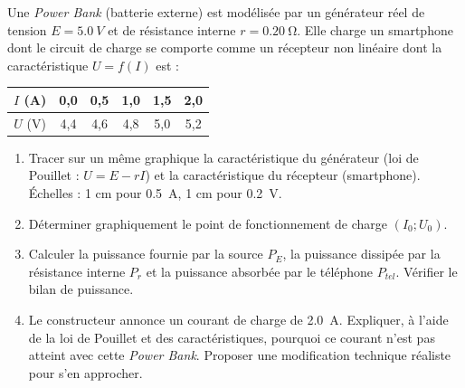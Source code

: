 \documentclass[11pt]{article}
\begin{document}
\begin{exercice}
Une \textit{Power Bank} (batterie externe) est modélisée par un générateur réel de tension $E = \SI{5,0}{V}$ et de résistance interne $r = \SI{0,20}{\ohm}$. Elle charge un smartphone dont le circuit de charge se comporte comme un récepteur non linéaire dont la caractéristique $U = f(I)$ est :
\begin{center}
\begin{tabular}{|c|c|c|c|c|c|}
\hline
$I$ (\si{\ampere}) & 0,0 & 0,5 & 1,0 & 1,5 & 2,0 \\
\hline $U$ (\si{\volt}) & 4,4 & 4,6 & 4,8 & 5,0 & 5,2 \\
\hline
\end{tabular}
\end{center}
\begin{enumerate}
\item Tracer sur un même graphique la caractéristique du générateur (loi de Pouillet : $U = E - rI$) et la caractéristique du récepteur (smartphone). Échelles : 1 cm pour \SI{0,5}{A}, 1 cm pour \SI{0,2}{V}.
\item Déterminer graphiquement le point de fonctionnement de charge $(I_0 ; U_0)$.
\item Calculer la puissance fournie par la source $P_E$, la puissance dissipée par la résistance interne $P_r$ et la puissance absorbée par le téléphone $P_{tel}$. Vérifier le bilan de puissance.
\item Le constructeur annonce un courant de charge de \SI{2,0}{A}. Expliquer, à l'aide de la loi de Pouillet et des caractéristiques, pourquoi ce courant n'est pas atteint avec cette \textit{Power Bank}. Proposer une modification technique réaliste pour s'en approcher.
\end{enumerate}
\end{exercice}
\end{document}
